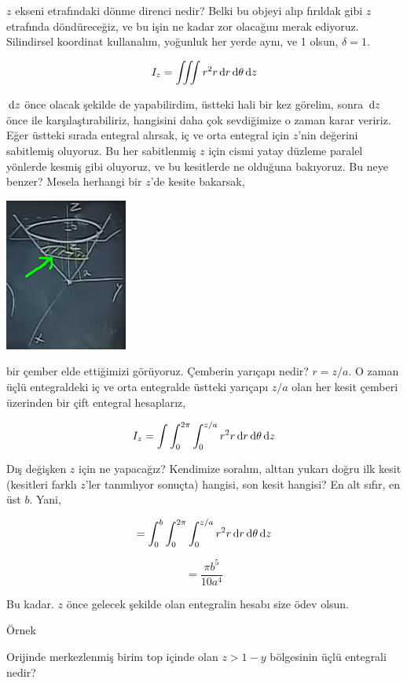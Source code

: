 \documentclass[12pt,fleqn]{article}\usepackage{../../common}
\begin{document}
$z$ ekseni etrafındaki dönme direnci nedir? Belki bu objeyi alıp fırıldak
gibi $z$ etrafında döndüreceğiz, ve bu işin ne kadar zor olacağını merak
ediyoruz. Silindirsel koordinat kullanalım, yoğunluk her yerde aynı, ve 1
olsun, $\delta = 1$.

$$ 
I_z = \iiint r^2 r \,\mathrm{d} r \,\mathrm{d} \theta \,\mathrm{d} z
$$

$\,\mathrm{d} z$ önce olacak şekilde de yapabilirdim, üstteki hali bir kez görelim,
sonra $\,\mathrm{d} z$ önce ile karşılaştırabiliriz, hangisini daha çok sevdiğimize
o zaman karar veririz. Eğer üstteki sırada entegral alırsak, iç ve orta
entegral için $z$'nin değerini sabitlemiş oluyoruz. Bu her sabitlenmiş $z$
için cismi yatay düzleme paralel yönlerde kesmiş gibi oluyoruz, ve bu
kesitlerde ne olduğuna bakıyoruz. Bu neye benzer? Mesela herhangi bir
$z$'de kesite bakarsak, 

\begin{center}
\includegraphics[height=5cm]{25_12.png}
\end{center}

bir çember elde ettiğimizi görüyoruz. Çemberin yarıçapı nedir? $r = z/a$. O
zaman üçlü entegraldeki iç ve orta entegralde üstteki yarıçapı $z/a$ olan
her kesit çemberi üzerinden bir çift entegral hesaplarız,

$$ 
I_z = \int \int _{0}^{2\pi} \int _{0}^{z/a} r^2 r \,\mathrm{d} r \,\mathrm{d} \theta \,\mathrm{d} z
$$

Dış değişken $z$ için ne yapacağız? Kendimize soralım, alttan yukarı doğru
ilk kesit (kesitleri farklı $z$'ler tanımlıyor sonuçta) hangisi, son kesit
hangisi? En alt sıfır, en üst $b$. Yani,

$$ 
 = \int _{0}^{b} \int _{0}^{2\pi} \int _{0}^{z/a} r^2 r \,\mathrm{d} r \,\mathrm{d} \theta \,\mathrm{d} z
$$

$$ = \frac{\pi b^5}{10 a^4}$$

Bu kadar. $z$ önce gelecek şekilde olan entegralin hesabı size ödev olsun. 

Örnek

Orijinde merkezlenmiş birim top içinde olan $z > 1-y$ bölgesinin üçlü
entegrali nedir? 
\end{document}
